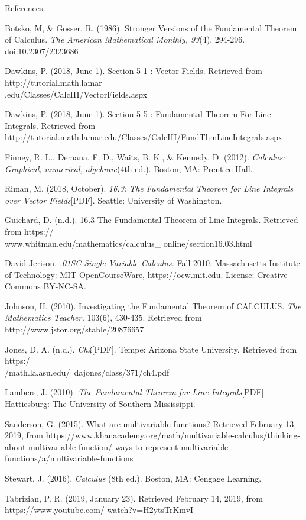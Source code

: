 \documentclass[11pt]{article}
\begin{document}
{\centering{}References

}
\begin{hangparas}{0.5in}{1}

Botsko, M, \& Gosser, R. (1986). Stronger Versions of the Fundamental Theorem of Calculus. \textit{The American Mathematical Monthly, 93}(4), 294-296. doi:10.2307/2323686

Dawkins, P. (2018, June 1). Section 5-1 : Vector Fields. Retrieved from http://tutorial.math.lamar\\.edu/Classes/CalcIII/VectorFields.aspx

Dawkins, P. (2018, June 1). Section 5-5 : Fundamental Theorem For Line Integrals. Retrieved from http://tutorial.math.lamar.edu/Classes/CalcIII/FundThmLineIntegrals.aspx

Finney, R. L., Demana, F. D., Waits, B. K., \& Kennedy, D. (2012). \textit{Calculus: Graphical, numerical, algebraic}(4th ed.). Boston, MA: Prentice Hall.

Riman, M. (2018, October). \textit{16.3: The Fundamental Theorem for Line Integrals over Vector Fields}[PDF]. Seattle: University of Washington.

Guichard, D. (n.d.). 16.3 The Fundamental Theorem of Line Integrals. Retrieved from https://\\www.whitman.edu/mathematics/calculus\_ online/section16.03.html

David Jerison. \textit{.01SC Single Variable Calculus.} Fall 2010. Massachusetts Institute of Technology: MIT OpenCourseWare, https://ocw.mit.edu. License: Creative Commons BY-NC-SA.

Johnson, H. (2010). Investigating the Fundamental Theorem of CALCULUS. \textit{The Mathematics Teacher,} 103(6), 430-435. Retrieved from http://www.jstor.org/stable/20876657

Jones, D. A. (n.d.). \textit{Ch4}[PDF]. Tempe: Arizona State University. Retrieved from https:/\\/math.la.asu.edu/~dajones/class/371/ch4.pdf

Lambers, J. (2010). \textit{The Fundamental Theorem for Line Integrals}[PDF]. Hattiesburg: The University of Southern Mississippi.

Sanderson, G. (2015). What are multivariable functions? Retrieved February 13, 2019, from https://www.khanacademy.org/math/multivariable-calculus/thinking-about-multivariable-function/
ways-to-represent-multivariable-functions/a/multivariable-functions

Stewart, J. (2016). \textit{Calculus} (8th ed.). Boston, MA: Cengage Learning.

Tabrizian, P. R. (2019, January 23). Retrieved February 14, 2019, from https://www.youtube.com/
watch?v=H2ytsTrKmvI
\end{hangparas}
\end{document}
